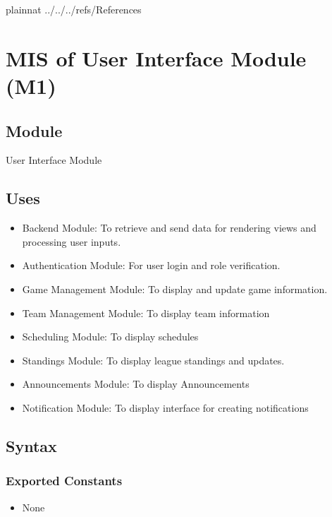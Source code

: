 \documentclass[12pt, titlepage]{article}
\begin{document}
\newpage

 {plainnat}
 {../../../refs/References}

\newpage

\section{MIS of User Interface Module (M1)} \label{Module:UI}

\subsection{Module}

User Interface Module

\subsection{Uses}

\begin{itemize}
  \item Backend Module: To retrieve and send data for rendering views and processing user inputs.
  \item Authentication Module: For user login and role verification.
  \item Game Management Module: To display and update game information.
  \item Team Management Module: To display team information
  \item Scheduling Module: To display schedules
  \item Standings Module: To display league standings and updates.
  \item Announcements Module: To display Announcements
  \item Notification Module: To display interface for creating notifications
\end{itemize}

\subsection{Syntax}

\subsubsection{Exported Constants}

\begin{itemize}
  \item None
\end{itemize}
\end{document}
